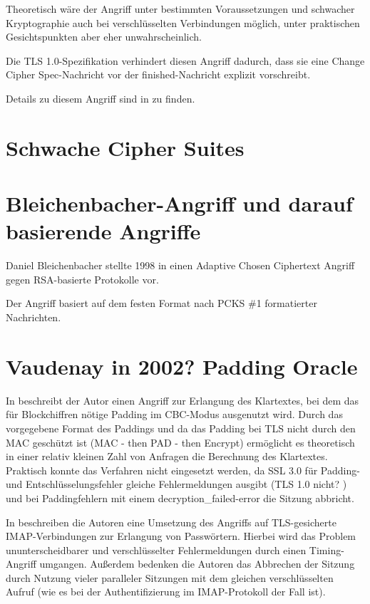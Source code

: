 \documentclass[
    12pt,
    headings=small,
    parskip=half,           %
    bibliography=totoc,
    numbers=noenddot,       %
    open=any,               %
    ]{scrreprt}
\newcommand{\finished}{finished}
\newcommand{\changecipherspec}{Change Cipher Spec}
\begin{document}
Theoretisch wäre der Angriff unter bestimmten Voraussetzungen und schwacher Kryptographie auch bei verschlüsselten Verbindungen möglich, unter praktischen Gesichtspunkten aber eher unwahrscheinlich.

Die TLS 1.0-Spezifikation verhindert diesen Angriff dadurch, dass sie eine \changecipherspec{}-Nachricht vor der \finished{}-Nachricht explizit vorschreibt.

Details zu diesem Angriff sind in \cite{wagner96} zu finden.

\section{Schwache Cipher Suites}

\section{Bleichenbacher-Angriff und darauf basierende Angriffe}

Daniel Bleichenbacher stellte 1998 in \cite{bleichenbacher98} einen Adaptive Chosen Ciphertext Angriff gegen RSA-basierte Protokolle vor.

Der Angriff basiert auf dem festen Format nach PCKS \#1 formatierter Nachrichten. 

\section{Vaudenay in 2002? Padding Oracle}

In \cite{vaudenay02} beschreibt der Autor einen Angriff zur Erlangung des Klartextes, bei dem das für Blockchiffren nötige Padding im CBC-Modus ausgenutzt wird. Durch das vorgegebene Format des Paddings und da das Padding bei TLS nicht durch den MAC geschützt ist (MAC - then PAD - then Encrypt) ermöglicht es theoretisch in einer relativ kleinen Zahl von Anfragen die Berechnung des Klartextes. Praktisch konnte das Verfahren nicht eingesetzt werden, da SSL 3.0 für Padding- und Entschlüsselungsfehler gleiche Fehlermeldungen ausgibt (TLS 1.0 nicht? ) und bei Paddingfehlern mit einem decryption\_failed-error die Sitzung abbricht.

In \cite{canvel03} beschreiben die Autoren eine Umsetzung des Angriffs auf TLS-gesicherte IMAP-Verbindungen zur Erlangung von Passwörtern. Hierbei wird das Problem ununterscheidbarer und verschlüsselter Fehlermeldungen durch einen Timing-Angriff umgangen. Außerdem bedenken die Autoren das Abbrechen der Sitzung durch Nutzung vieler paralleler Sitzungen mit dem gleichen verschlüsselten Aufruf (wie es bei der Authentifizierung im IMAP-Protokoll der Fall ist).
\end{document}
